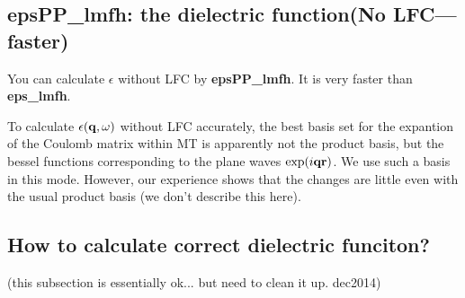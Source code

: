 \documentclass[a4paper,10pt,epsf,fleqn]{article}
\newcommand{\exe}[1]{{\bf #1}}
\begin{document}
\subsection{epsPP\_lmfh: the dielectric function(No LFC--- faster)}

You can calculate $\epsilon$ without LFC by
{\bf epsPP\_lmfh}. It is very faster than \exe{eps\_lmfh}.

To calculate $\epsilon({\bf q},\omega)$ without LFC accurately,
the best basis set for the expantion of the Coulomb matrix within MT
is apparently not the product basis, but the bessel functions
corresponding to the plane waves $\exp(i{\bf q r})$.
We use such a basis in this mode. 
However, our experience shows that the changes are little even 
with the usual product basis (we don't describe this here).
%



\subsection{How to calculate correct dielectric funciton?}

(this subsection is essentially ok... but need to clean it up. dec2014)
\end{document}

